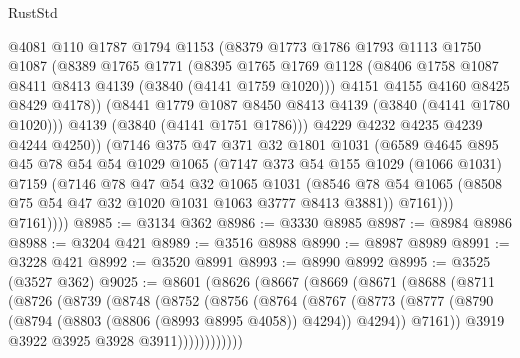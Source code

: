 \begin{lexlean}{RustStd}
\begin{coremodule}
{\begin{coremodule}
{{{{{{{{{{{{{{{{{{{{{{{{{{              @4081
              @110
              @1787
              @1794
              @1153
              (@8379
                @1773
                @1786
                @1793
                @1113
                @1750
                @1087
                (@8389
                  @1765
                  @1771
                  (@8395
                    @1765
                    @1769
                    @1128
                    (@8406 @1758 @1087 @8411 @8413 @4139 (@3840 (@4141 @1759 @1020)))
                    @4151
                    @4155
                    @4160
                    @8425
                    @8429
                    @4178))
                (@8441 @1779 @1087 @8450 @8413 @4139 (@3840 (@4141 @1780 @1020)))
                @4139
                (@3840 (@4141 @1751 @1786)))
              @4229
              @4232
              @4235
              @4239
              @4244
              @4250))
          (@7146
            @375
            @47
            @371
            @32
            @1801
            @1031
            (@6589
              @4645
              @895
              @45
              @78
              @54
              @54
              @1029
              @1065
              (@7147
                @373
                @54
                @155
                @1029
                (@1066 @1031)
                @7159
                (@7146
                  @78
                  @47
                  @54
                  @32
                  @1065
                  @1031
                  (@8546 @78 @54 @1065 (@8508 @75 @54 @47 @32 @1020 @1031 @1063 @3777 @8413 @3881))
                  @7161)))
            @7161))))
@8985 := @3134 @362
@8986 := @3330 @8985
@8987 := @8984 @8986
@8988 := @3204 @421
@8989 := @3516 @8988
@8990 := @8987 @8989
@8991 := @3228 @421
@8992 := @3520 @8991
@8993 := @8990 @8992
@8995 := @3525 (@3527 @362)
@9025 := @8601
    (@8626
      (@8667
        (@8669
          (@8671
            (@8688
              (@8711
                (@8726
                  (@8739
                    (@8748
                      (@8752
                        (@8756
                          (@8764
                            (@8767
                              (@8773
                                (@8777
                                  (@8790 (@8794 (@8803 (@8806 (@8993 @8995 @4058)) @4294)) @4294))
                                @7161))
                            @3919
                            @3922
                            @3925
                            @3928
                            @3911))))))))))))
}}}}}}}}}}}}}}}}}}}}}}}}}}
\end{coremodule}}
\end{coremodule}
\end{lexlean}

